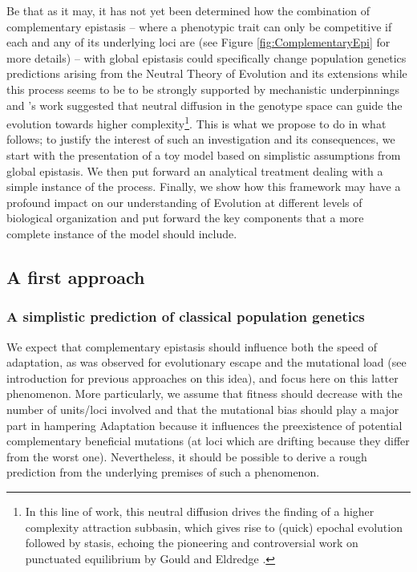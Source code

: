 Be that as it may, it has not yet been determined how the combination of complementary epistasis \citep{Crow71,Sackton16} -- where a phenotypic trait can only be competitive if each and any of its underlying loci are (see Figure \ref{fig:ComplementaryEpi} for more details) -- with global epistasis \citep{Otwinowski18} could specifically change population genetics predictions arising from the Neutral Theory of Evolution and its extensions \citep{Kimura68,Ohta73,Ohta92} while this process seems to be to be strongly supported by mechanistic underpinnings \citep{Kacser73,Hartl85,Yi19,Taverna02,Bloom05,Labourel21} and \citet{Crutchfield00}'s work suggested that neutral diffusion in the genotype space can guide the evolution towards higher complexity\footnote{In this line of work, this neutral diffusion drives the finding of a higher complexity attraction subbasin, which gives rise to (quick) epochal evolution followed by stasis, echoing the pioneering and controversial work on punctuated equilibrium by Gould and Eldredge \citep{Eldredge71,Eldredge97}.}. This is what we propose to do in what follows; to justify the interest of such an investigation and its consequences, we start with the presentation of a toy model based on simplistic assumptions from global epistasis. We then put forward an analytical treatment dealing with a simple instance of the process. Finally, we show how this framework may have a profound impact on our understanding of Evolution at different levels of biological organization and put forward the key components that a more complete instance of the model should include. %

\subsection{{A first approach}\label{sec:FA}}
\subsubsection{A simplistic prediction of classical population genetics }

We expect that complementary epistasis should influence both the speed of adaptation, as was observed for evolutionary escape \citep{Weinreich05,Weissman09} and the mutational load (see introduction for previous approaches on this idea), and focus here on this latter phenomenon. More particularly, we assume that fitness should decrease with the number of units/loci involved and that the mutational bias should play a major part in hampering Adaptation because it influences the preexistence of potential complementary beneficial mutations (at loci which are drifting because they differ from the worst one). Nevertheless, it should be possible to derive a rough prediction from the underlying premises of such a phenomenon.

